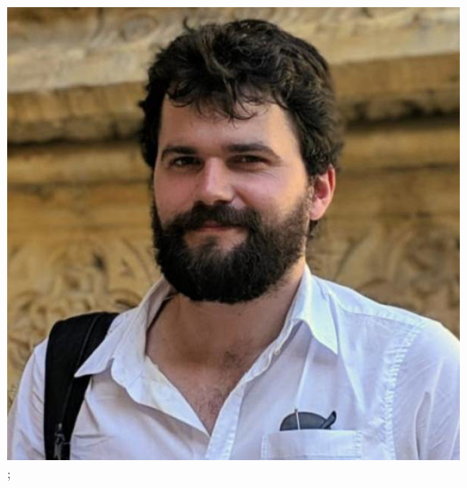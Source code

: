 \documentclass[aspectratio=169]{beamer}
\begin{document}
\begin{frame}
{        \includegraphics[width=0.10\textheight]{figures/students/will_handley.jpg}%
    };
\end{frame}
\end{document}
